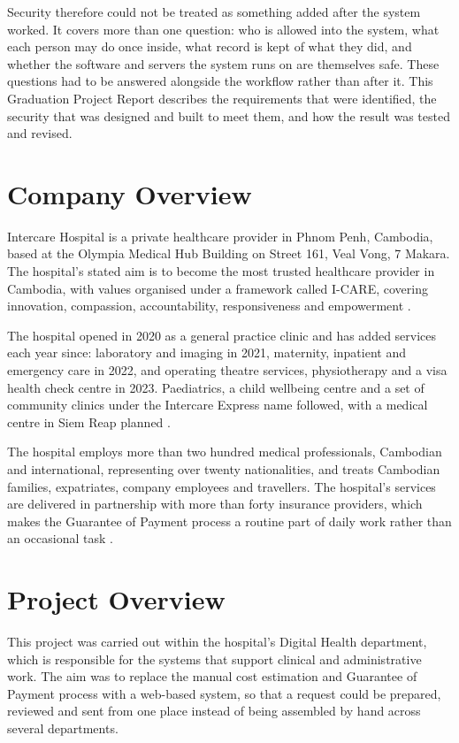 Security therefore could not be treated as something added after the system worked. It covers more than one question: who is allowed into the system, what each person may do once inside, what record is kept of what they did, and whether the software and servers the system runs on are themselves safe. These questions had to be answered alongside the workflow rather than after it. This Graduation Project Report describes the requirements that were identified, the security that was designed and built to meet them, and how the result was tested and revised.

\section{Company Overview}
\label{sec:intro-company}

Intercare Hospital is a private healthcare provider in Phnom Penh, Cambodia, based at the Olympia Medical Hub Building on Street 161, Veal Vong, 7 Makara. The hospital's stated aim is to become the most trusted healthcare provider in Cambodia, with values organised under a framework called I-CARE, covering innovation, compassion, accountability, responsiveness and empowerment \cite{intercare}.

The hospital opened in 2020 as a general practice clinic and has added services each year since: laboratory and imaging in 2021, maternity, inpatient and emergency care in 2022, and operating theatre services, physiotherapy and a visa health check centre in 2023. Paediatrics, a child wellbeing centre and a set of community clinics under the Intercare Express name followed, with a medical centre in Siem Reap planned \cite{intercare}.

The hospital employs more than two hundred medical professionals, Cambodian and international, representing over twenty nationalities, and treats Cambodian families, expatriates, company employees and travellers. The hospital's services are delivered in partnership with more than forty insurance providers, which makes the Guarantee of Payment process a routine part of daily work rather than an occasional task \cite{intercare}.

\section{Project Overview}
\label{sec:intro-project}

This project was carried out within the hospital's Digital Health department, which is responsible for the systems that support clinical and administrative work. The aim was to replace the manual cost estimation and Guarantee of Payment process with a web-based system, so that a request could be prepared, reviewed and sent from one place instead of being assembled by hand across several departments.

